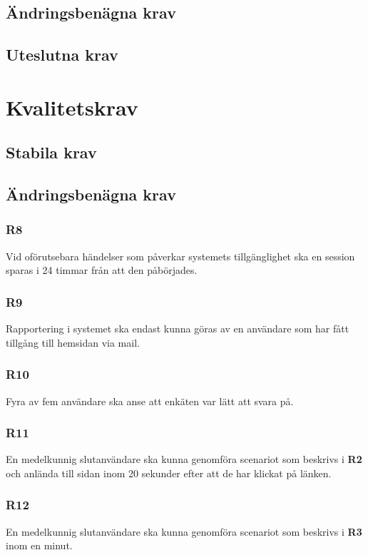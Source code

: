 \documentclass{article}
\begin{document}
    \newpage
    \subsection*{Ändringsbenägna krav}
    \subsection*{Uteslutna krav}
    
  
   
    \section{Kvalitetskrav}
    \subsection*{Stabila krav}
    
  
     \subsection*{Ändringsbenägna krav}
     \subsubsection*{R8}
     Vid oförutsebara händelser som påverkar systemets tillgänglighet ska en session sparas i 24 timmar från att den påbörjades.
     
    
    \subsubsection*{R9}
    Rapportering i systemet ska endast kunna göras av en användare som har fått tillgång till hemsidan via mail.
    
     
    \subsubsection*{R10}
    Fyra av fem användare ska anse att enkäten var lätt att svara på.
    
    \subsubsection*{R11}
    En medelkunnig slutanvändare ska kunna genomföra scenariot som beskrivs i \textbf{R2} och anlända till sidan inom 20 sekunder efter att de har klickat på länken.
    
    \subsubsection*{R12}
    En medelkunnig slutanvändare ska kunna genomföra scenariot som beskrivs i \textbf{R3} inom en minut.
    
\end{document}
